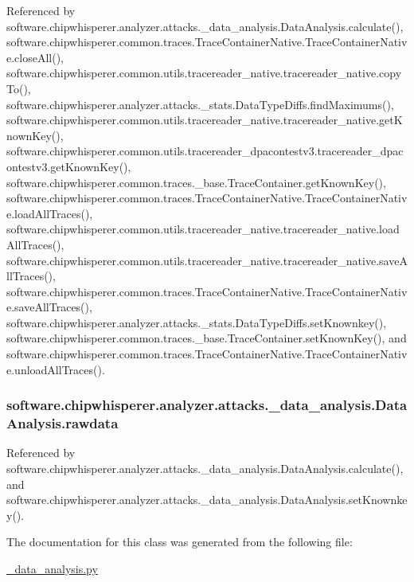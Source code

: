 Referenced by software.\+chipwhisperer.\+analyzer.\+attacks.\+\_\+data\+\_\+analysis.\+Data\+Analysis.\+calculate(), software.\+chipwhisperer.\+common.\+traces.\+Trace\+Container\+Native.\+Trace\+Container\+Native.\+close\+All(), software.\+chipwhisperer.\+common.\+utils.\+tracereader\+\_\+native.\+tracereader\+\_\+native.\+copy\+To(), software.\+chipwhisperer.\+analyzer.\+attacks.\+\_\+stats.\+Data\+Type\+Diffs.\+find\+Maximums(), software.\+chipwhisperer.\+common.\+utils.\+tracereader\+\_\+native.\+tracereader\+\_\+native.\+get\+Known\+Key(), software.\+chipwhisperer.\+common.\+utils.\+tracereader\+\_\+dpacontestv3.\+tracereader\+\_\+dpacontestv3.\+get\+Known\+Key(), software.\+chipwhisperer.\+common.\+traces.\+\_\+base.\+Trace\+Container.\+get\+Known\+Key(), software.\+chipwhisperer.\+common.\+traces.\+Trace\+Container\+Native.\+Trace\+Container\+Native.\+load\+All\+Traces(), software.\+chipwhisperer.\+common.\+utils.\+tracereader\+\_\+native.\+tracereader\+\_\+native.\+load\+All\+Traces(), software.\+chipwhisperer.\+common.\+utils.\+tracereader\+\_\+native.\+tracereader\+\_\+native.\+save\+All\+Traces(), software.\+chipwhisperer.\+common.\+traces.\+Trace\+Container\+Native.\+Trace\+Container\+Native.\+save\+All\+Traces(), software.\+chipwhisperer.\+analyzer.\+attacks.\+\_\+stats.\+Data\+Type\+Diffs.\+set\+Knownkey(), software.\+chipwhisperer.\+common.\+traces.\+\_\+base.\+Trace\+Container.\+set\+Known\+Key(), and software.\+chipwhisperer.\+common.\+traces.\+Trace\+Container\+Native.\+Trace\+Container\+Native.\+unload\+All\+Traces().

\hypertarget{classsoftware_1_1chipwhisperer_1_1analyzer_1_1attacks_1_1__data__analysis_1_1DataAnalysis_a6f5e5781d17b950cb00eb4ce0177a2b5}{}
\subsubsection[{rawdata}]{\setlength{\rightskip}{0pt plus 5cm}software.\+chipwhisperer.\+analyzer.\+attacks.\+\_\+data\+\_\+analysis.\+Data\+Analysis.\+rawdata}\label{classsoftware_1_1chipwhisperer_1_1analyzer_1_1attacks_1_1__data__analysis_1_1DataAnalysis_a6f5e5781d17b950cb00eb4ce0177a2b5}


Referenced by software.\+chipwhisperer.\+analyzer.\+attacks.\+\_\+data\+\_\+analysis.\+Data\+Analysis.\+calculate(), and software.\+chipwhisperer.\+analyzer.\+attacks.\+\_\+data\+\_\+analysis.\+Data\+Analysis.\+set\+Knownkey().



The documentation for this class was generated from the following file\+:\begin{DoxyCompactItemize}
\item 
\hyperlink{__data__analysis_8py}{\+\_\+data\+\_\+analysis.\+py}\end{DoxyCompactItemize}
